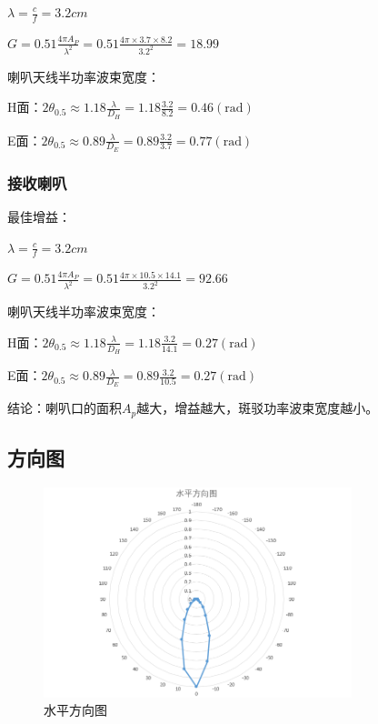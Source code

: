 \documentclass{../source/Experiment}
\begin{document}
            $\lambda = \frac{c}{f} = 3.2cm$

            $G=0.51 \frac{4 \pi A_{P}}{\lambda^{2}}=0.51 \frac{4 \pi \times 3.7 \times  8.2 }{3.2^{2}}=18.99$

            喇叭天线半功率波束宽度：

            H面：$2 \theta_{0.5} \approx 1.18 \frac{\lambda}{D_{H}}=1.18 \frac{3.2}{8.2}=0.46(\mathrm{rad})$

            E面：$2 \theta_{0.5} \approx 0.89 \frac{\lambda}{D_{E}}=0.89 \frac{3.2}{3.7}=0.77(\mathrm{rad})$

            \subsubsection{接收喇叭}
            最佳增益：
            
            $\lambda = \frac{c}{f} = 3.2cm$

            $G=0.51 \frac{4 \pi A_{P}}{\lambda^{2}}=0.51 \frac{4 \pi \times 10.5 \times  14.1 }{3.2^{2}}=92.66$

            喇叭天线半功率波束宽度：

            H面：$2 \theta_{0.5} \approx 1.18 \frac{\lambda}{D_{H}}=1.18 \frac{3.2}{14.1}=0.27(\mathrm{rad})$

            E面：$2 \theta_{0.5} \approx 0.89 \frac{\lambda}{D_{E}}=0.89 \frac{3.2}{10.5}=0.27(\mathrm{rad})$
            
            结论：喇叭口的面积$A_p$越大，增益越大，斑驳功率波束宽度越小。

        \subsection{方向图}
        
        \begin{figure}[H]
            \centering
            \includegraphics[width = 0.8\textwidth]{pic/水平.png}
            \caption{水平方向图}
        \end{figure}
\end{document}
